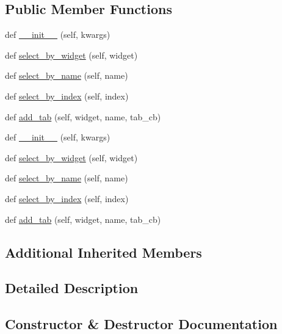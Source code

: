 \subsection*{Public Member Functions}
\begin{DoxyCompactItemize}
\item 
def \hyperlink{classremi_1_1gui_1_1TabBox_a67dbc8f1339f4a75be63bf24f52b1d3c}{\+\_\+\+\_\+init\+\_\+\+\_\+} (self, kwargs)
\item 
def \hyperlink{classremi_1_1gui_1_1TabBox_aa06f79002d74e9c11870399d160042aa}{select\+\_\+by\+\_\+widget} (self, widget)
\item 
def \hyperlink{classremi_1_1gui_1_1TabBox_ad92a16cf0bfb37e8eb2942984b8c7759}{select\+\_\+by\+\_\+name} (self, name)
\item 
def \hyperlink{classremi_1_1gui_1_1TabBox_a42896d30ac207b0b9216901f4e95c152}{select\+\_\+by\+\_\+index} (self, index)
\item 
def \hyperlink{classremi_1_1gui_1_1TabBox_a366da180a88367c2a080f59b668e5c78}{add\+\_\+tab} (self, widget, name, tab\+\_\+cb)
\item 
def \hyperlink{classremi_1_1gui_1_1TabBox_a67dbc8f1339f4a75be63bf24f52b1d3c}{\+\_\+\+\_\+init\+\_\+\+\_\+} (self, kwargs)
\item 
def \hyperlink{classremi_1_1gui_1_1TabBox_aa06f79002d74e9c11870399d160042aa}{select\+\_\+by\+\_\+widget} (self, widget)
\item 
def \hyperlink{classremi_1_1gui_1_1TabBox_ad92a16cf0bfb37e8eb2942984b8c7759}{select\+\_\+by\+\_\+name} (self, name)
\item 
def \hyperlink{classremi_1_1gui_1_1TabBox_a42896d30ac207b0b9216901f4e95c152}{select\+\_\+by\+\_\+index} (self, index)
\item 
def \hyperlink{classremi_1_1gui_1_1TabBox_a366da180a88367c2a080f59b668e5c78}{add\+\_\+tab} (self, widget, name, tab\+\_\+cb)
\end{DoxyCompactItemize}
\subsection*{Additional Inherited Members}


\subsection{Detailed Description}
\begin{DoxyVerb}\end{DoxyVerb}
 

\subsection{Constructor \& Destructor Documentation}
